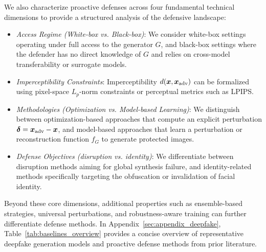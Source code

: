 \documentclass{article}
\begin{document}
We also characterize proactive defenses across four fundamental technical dimensions to provide a structured analysis of the defensive landscape:
\begin{itemize}[leftmargin=*, nosep]
\item \emph{Access Regime (White-box vs. Black-box)}: We consider white-box settings operating under full access to the generator $G$, and black-box settings where the defender has no direct knowledge of $G$ and relies on cross-model transferability or surrogate models.
\item \emph{Imperceptibility Constraints}: Imperceptibility $d({\bm{x}},{\bm{x}}_{\mathrm{adv}})$ can be formalized using pixel-space $L_p$-norm constraints or perceptual metrics such as LPIPS.
\item \emph{Methodologies (Optimization vs. Model-based Learning)}: We distinguish between optimization-based approaches that compute an explicit perturbation $\bm{\delta} = {\bm{x}}_{\mathrm{adv}} - {\bm{x}}$, and model-based approaches that learn a perturbation or reconstruction function $f_G$ to generate protected images.
\item \emph{Defense Objectives (disruption vs. identity)}: We differentiate between disruption methods aiming for global synthesis failure, and identity-related methods specifically targeting the obfuscation or invalidation of facial identity.
\end{itemize}
Beyond these core dimensions, additional properties such as ensemble-based strategies, universal perturbations, and robustness-aware training can further differentiate defense methods. 
%
In Appendix~\ref{sec:appendix_deepfake}, Table~\ref{tab:baselines_overview} provides a concise overview of representative deepfake generation models and proactive defense methods from prior literature.
\end{document}
